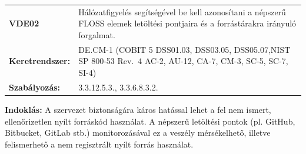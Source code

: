 \documentclass[12pt,magyar,a4paper,oneside]{scrreprt}
\begin{document}
\begin{longtable}[]{@{}ll@{}}
\toprule
\endhead
\begin{minipage}[t]{0.16\columnwidth}\raggedright
\textbf{VDE02}\strut
\end{minipage} & \begin{minipage}[t]{0.79\columnwidth}\raggedright
Hálózatfigyelés segítségével be kell azonosítani a népszerű FLOSS elemek
letöltési pontjaira és a forrástárakra irányuló forgalmat.\strut
\end{minipage}\tabularnewline
\begin{minipage}[t]{0.16\columnwidth}\raggedright
\textbf{Keretrendszer:}\strut
\end{minipage} & \begin{minipage}[t]{0.79\columnwidth}\raggedright
DE.CM-1 (COBIT 5 DSS01.03, DSS03.05, DSS05.07,NIST SP 800-53 Rev.~4
AC-2, AU-12, CA-7, CM-3, SC-5, SC-7, SI-4)\strut
\end{minipage}\tabularnewline
\begin{minipage}[t]{0.16\columnwidth}\raggedright
\textbf{Szabályozás:}\strut
\end{minipage} & \begin{minipage}[t]{0.79\columnwidth}\raggedright
3.3.12.5.3., 3.3.6.8.3.2.\strut
\end{minipage}\tabularnewline
\bottomrule
\end{longtable}

\textbf{Indoklás: } A szervezet biztonságára káros hatással lehet a fel
nem ismert, ellenőrizetlen nyílt forráskód használat. A népszerű
letöltési pontok (pl. GitHub, Bitbucket, GitLab stb.) monitorozásával ez
a veszély mérsékelhető, illetve felismerhető a nem regisztrált nyílt
forrás használat.
\end{document}
